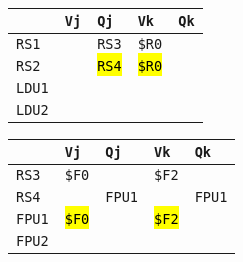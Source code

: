 \begin{enumerate}
    \begin{minipage}{0.45\textwidth}
        \centering
        \begin{tabular}{@{} l | l l l l @{}}
            \toprule
                & \texttt{Vj} & \texttt{Qj} & \texttt{Vk} & \texttt{Qk} \\
            \midrule
            \texttt{RS1} & & \texttt{RS3} & \texttt{\$R0} & \\ [.3em]
            \texttt{RS2} & & \hl{\texttt{RS4}} & \hl{\texttt{\$R0}} & \\
            \cmidrule{1-5}
            \texttt{LDU1} & & & & \\ [.3em]
            \texttt{LDU2} & & & & \\
            \bottomrule
        \end{tabular}
    \end{minipage}
    \hfill
    \begin{minipage}{0.45\textwidth}
        \centering
        \begin{tabular}{@{} l | l l l l @{}}
            \toprule
            & \texttt{Vj} & \texttt{Qj} & \texttt{Vk} & \texttt{Qk} \\
            \midrule
            \texttt{RS3} & \texttt{\$F0} & & \texttt{\$F2} & \\ [.3em]
            \texttt{RS4} & & \texttt{FPU1} & & \texttt{FPU1} \\
            \cmidrule{1-5}
            \texttt{FPU1} & \hl{\texttt{\$F0}} & & \hl{\texttt{\$F2}} & \\ [.3em]
            \texttt{FPU2} & & & & \\
            \bottomrule
        \end{tabular}
    \end{minipage}


\end{enumerate}
